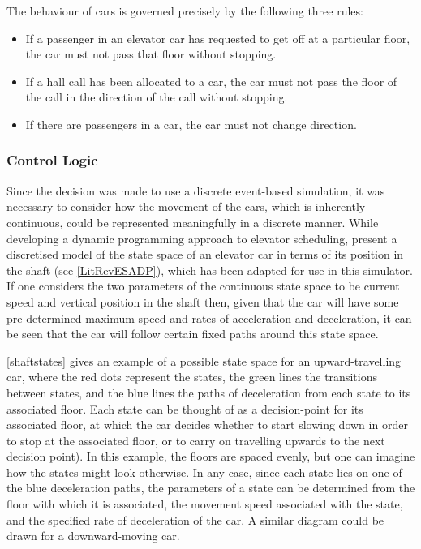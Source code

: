 \documentclass{UoYCSproject}
\begin{document}
The behaviour of cars is governed precisely by the following three rules:
\begin{itemize}
	\item If a passenger in an elevator car has requested to get off at a particular floor, the car must not pass that floor without stopping.
	\item If a hall call has been allocated to a car, the car must not pass the floor of the call in the direction of the call without stopping.
	\item If there are passengers in a car, the car must not change direction.
\end{itemize}

\subsubsection{Control Logic}

Since the decision was made to use a discrete event-based simulation, it was necessary to consider how the movement of the cars, which is inherently continuous, could be represented meaningfully in a discrete manner.  While developing a dynamic programming approach to elevator scheduling, \citet{Nikovski2003} present a discretised model of the state space of an elevator car in terms of its position in the shaft (see \autoref{LitRevESADP}), which has been adapted for use in this simulator.  If one considers the two parameters of the continuous state space to be current speed and vertical position in the shaft then, given that the car will have some pre-determined maximum speed and rates of acceleration and deceleration, it can be seen that the car will follow certain fixed paths around this state space.

\autoref{shaftstates} gives an example of a possible state space for an upward-travelling car, where the red dots represent the states, the green lines the transitions between states, and the blue lines the paths of deceleration from each state to its associated floor.  Each state can be thought of as a decision-point for its associated floor, at which the car decides whether to start slowing down in order to stop at the associated floor, or to carry on travelling upwards to the next decision point).  In this example, the floors are spaced evenly, but one can imagine how the states might look otherwise.  In any case, since each state lies on one of the blue deceleration paths, the parameters of a state can be determined from the floor with which it is associated, the movement speed associated with the state, and the specified rate of deceleration of the car.  A similar diagram could be drawn for a downward-moving car.
\end{document}
